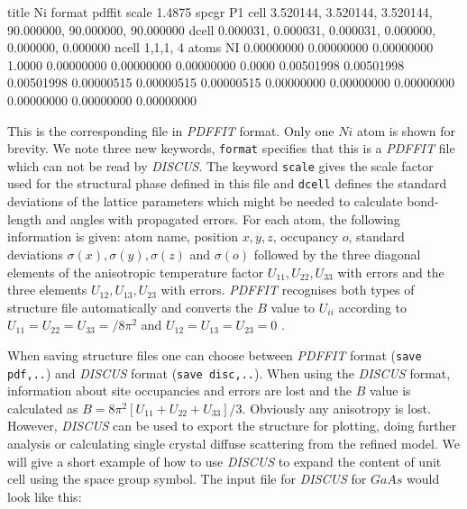 \begin{MacVerbatim}
    title  Ni
    format pdffit
    scale  1.4875
    spcgr  P1
    cell   3.520144,  3.520144,  3.520144, 90.000000, 90.000000, 90.000000
    dcell  0.000031,  0.000031,  0.000031,  0.000000,  0.000000,  0.000000
    ncell  1,1,1, 4
    atoms
    NI      0.00000000        0.00000000        0.00000000       1.0000
            0.00000000        0.00000000        0.00000000       0.0000
            0.00501998        0.00501998        0.00501998
            0.00000515        0.00000515        0.00000515
            0.00000000        0.00000000        0.00000000
            0.00000000        0.00000000        0.00000000
\end{MacVerbatim}

This is the corresponding file in {\it PDFFIT} format. Only one $Ni$
atom is shown for brevity. We note three new keywords, {\tt format}
specifies that this is a {\it PDFFIT} file which can not be read by
{\it DISCUS}. The keyword {\tt scale} gives the scale factor used
for the structural phase defined in this file and {\tt dcell}
defines the standard deviations of the lattice parameters which
might be needed to calculate bond-length and angles with propagated
errors. For each atom, the following information is given: atom
name, position $x,y,z$, occupancy $o$, standard deviations
$\sigma(x), \sigma(y), \sigma(z)$ and $\sigma(o)$ followed by the
three diagonal elements of the anisotropic temperature factor
$U_{11}, U_{22}, U_{33}$ with errors and the three elements $U_{12},
U_{13}, U_{23}$ with errors. {\it PDFFIT} recognises both types of
structure file automatically and converts the $B$ value to $U_{ii}$
according to $U_{11} = U_{22} = U_{33} =
 / 8 \pi^{2}$ and $U_{12} = U_{13} = U_{23} = 0$ \citep{sands}.
\par

When saving structure files one can choose between {\it PDFFIT}
format ({\tt save pdf,..}) and {\it DISCUS} format ({\tt save
disc,..}). When using the {\it DISCUS} format, information about
site occupancies and errors are lost and the $B$ value is
calculated as $B = 8 \pi^{2} [U_{11} + U_{22} + U_{33}]/3$.
Obviously any anisotropy is lost. However, {\it DISCUS} can be
used to export the structure for plotting, doing further analysis
or calculating single crystal diffuse scattering from the refined
model. We will give a short example of how to use {\it DISCUS} to
expand the content of unit cell using the space group symbol. The
input file for {\it DISCUS} for $GaAs$ would look like this:

